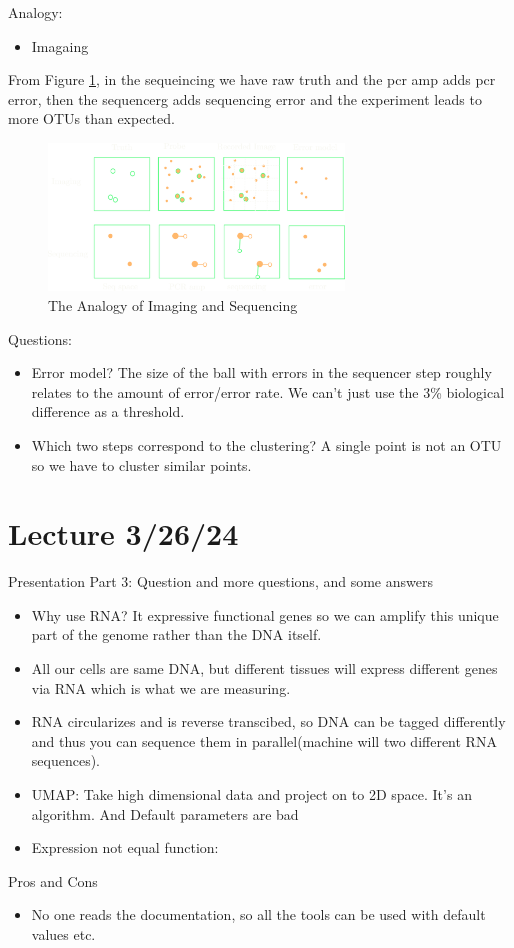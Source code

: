 \documentclass[../main.tex]{subfiles}
\begin{document}
Analogy:
\begin{itemize}
    \item Imagaing 
\end{itemize}
From Figure \ref{fig:sequencing}, in the sequeincing we have raw truth and the pcr amp adds pcr error, then the
sequencerg adds sequencing error and the experiment leads to more OTUs than expected.
\begin{figure}[ht]
    \centering
    \includegraphics[width=0.7\textwidth]{im_seq.png}
    \caption{The Analogy of Imaging and Sequencing}
    \label{fig:sequencing}
\end{figure}
Questions:
\begin{itemize}
    \item Error model? The size of the ball with errors in the sequencer step roughly relates to the
    amount of error/error rate. We can't just use the 3\% biological difference as a threshold.
    \item Which two steps correspond to the clustering? A single point is not an OTU so we have to
    cluster similar points. 
\end{itemize}

\newpage
\section*{Lecture 3/26/24}
Presentation Part 3: Question and more questions, and some answers
\begin{itemize}
    \item Why use RNA? It expressive functional genes so we can amplify this unique part of the genome rather
    than the DNA itself. 
    \item All our cells are same DNA, but different tissues will express
    different genes via RNA which is what we are measuring. 
    \item RNA circularizes and is reverse transcibed, so DNA can be tagged differently and thus you
    can sequence them in parallel(machine will two different RNA sequences).
    \item UMAP: Take high dimensional data and project on to 2D space. It's an algorithm. And Default
    parameters are bad
    \item Expression not equal function:
\end{itemize}
Pros and Cons 
\begin{itemize}
    \item No one reads the documentation, so all the tools can be used with default values etc.
\end{itemize}
\end{document}
